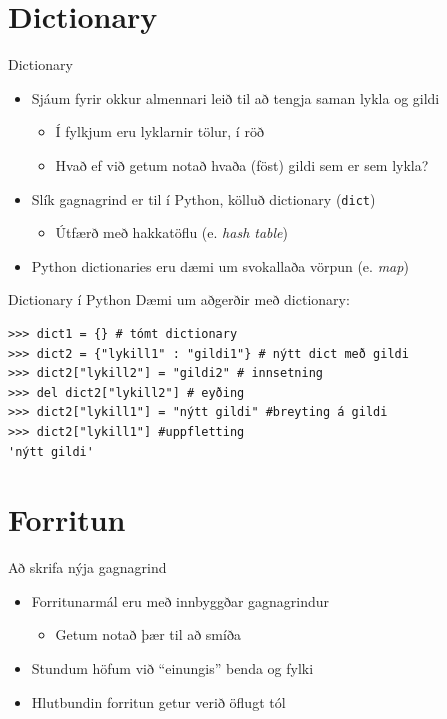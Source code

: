 \documentclass{beamer}
\begin{document}
\section{Dictionary}
\begin{frame}{Dictionary}
\begin{itemize}
 \item Sjáum fyrir okkur almennari leið til að tengja saman lykla og gildi
 \begin{itemize}
  \item Í fylkjum eru lyklarnir tölur, í röð
  \item Hvað ef við getum notað hvaða (föst) gildi sem er sem lykla?
 \end{itemize}
 \item Slík gagnagrind er til í Python, kölluð dictionary (\texttt{dict})
 \begin{itemize}
  \item Útfærð með hakkatöflu (e. \emph{hash table})
 \end{itemize}
 \item Python dictionaries eru dæmi um svokallaða vörpun (e. \emph{map})
\end{itemize}
\end{frame}

\begin{frame}[fragile]{Dictionary í Python}
Dæmi um aðgerðir með dictionary:
\begin{verbatim}
>>> dict1 = {} # tómt dictionary
>>> dict2 = {"lykill1" : "gildi1"} # nýtt dict með gildi
>>> dict2["lykill2"] = "gildi2" # innsetning
>>> del dict2["lykill2"] # eyðing
>>> dict2["lykill1"] = "nýtt gildi" #breyting á gildi
>>> dict2["lykill1"] #uppfletting
'nýtt gildi'
\end{verbatim}
\end{frame}

\section{Forritun}

\begin{frame}{Að skrifa nýja gagnagrind}
\begin{itemize}
 \item Forritunarmál eru með innbyggðar gagnagrindur
 \begin{itemize}
  \item Getum notað þær til að smíða
 \end{itemize}
 \item Stundum höfum við ``einungis'' benda og fylki
 \item Hlutbundin forritun getur verið öflugt tól
\end{itemize}
\end{frame}
\end{document}

